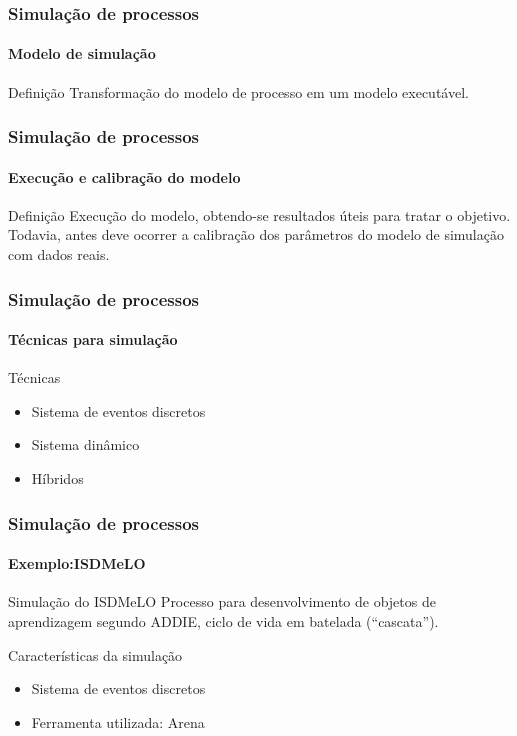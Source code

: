 \begin{frame}
	\frametitle{Simulação de processos}
	\framesubtitle{Modelo de simulação}
	
	\begin{block:concept}{Definição}
		Transformação do modelo de processo em um modelo executável.
	\end{block:concept}
\end{frame}


\begin{frame}
	\frametitle{Simulação de processos}
	\framesubtitle{Execução e calibração do modelo}
	
	\begin{block:concept}{Definição}
		Execução do modelo, obtendo-se resultados úteis para tratar o objetivo. Todavia,
		antes deve ocorrer a calibração dos parâmetros do modelo de simulação com
		dados reais.
	\end{block:concept}
\end{frame}


\begin{frame}
	\frametitle{Simulação de processos}
	\framesubtitle{Técnicas para simulação}
	
	\begin{block:concept}{Técnicas}
		\begin{itemize}
			\item Sistema de eventos discretos
			\item Sistema dinâmico
			\item Híbridos
		\end{itemize}
	\end{block:concept}
\end{frame}


\begin{frame}
	\frametitle{Simulação de processos}
	\framesubtitle{Exemplo:ISDMeLO}
	
	\begin{block:fact}{Simulação do ISDMeLO}
			Processo para desenvolvimento de objetos de aprendizagem segundo ADDIE, ciclo de
			vida em batelada (``cascata'').
	\end{block:fact}
	
	\begin{block:fact}{Características da simulação}
		\begin{itemize}
			\item Sistema de eventos discretos
			\item Ferramenta utilizada: Arena
		\end{itemize}
	\end{block:fact}
\end{frame}


